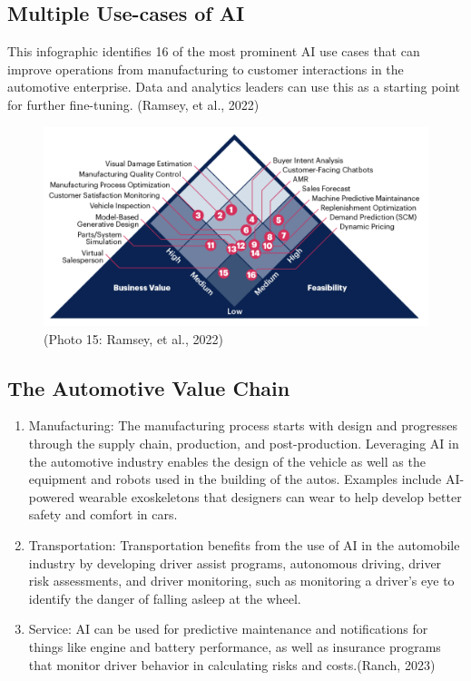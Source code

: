 \documentclass[
]{article}
\begin{document}
\hypertarget{multiple-use-cases-of-ai}{%
\subsection{Multiple Use-cases of AI}\label{multiple-use-cases-of-ai}}

This infographic identifies 16 of the most prominent AI use cases that can improve operations from manufacturing to customer interactions in the automotive enterprise. Data and analytics leaders can use this as a starting point for further fine-tuning. (Ramsey, et al., 2022)

\begin{figure}
\centering
\includegraphics{Pyramid.png}
\caption{(Photo 15: Ramsey, et al., 2022)}
\end{figure}

\hypertarget{the-automotive-value-chain}{%
\subsection{The Automotive Value Chain}\label{the-automotive-value-chain}}

\begin{enumerate}
\def\labelenumi{\arabic{enumi}.}
\item
  Manufacturing: The manufacturing process starts with design and progresses through the supply chain, production, and post-production. Leveraging AI in the automotive industry enables the design of the vehicle as well as the equipment and robots used in the building of the autos. Examples include AI-powered wearable exoskeletons that designers can wear to help develop better safety and comfort in cars.
\item
  Transportation: Transportation benefits from the use of AI in the automobile industry by developing driver assist programs, autonomous driving, driver risk assessments, and driver monitoring, such as monitoring a driver's eye to identify the danger of falling asleep at the wheel.
\item
  Service: AI can be used for predictive maintenance and notifications for things like engine and battery performance, as well as insurance programs that monitor driver behavior in calculating risks and costs.(Ranch, 2023)
\end{enumerate}
\end{document}
